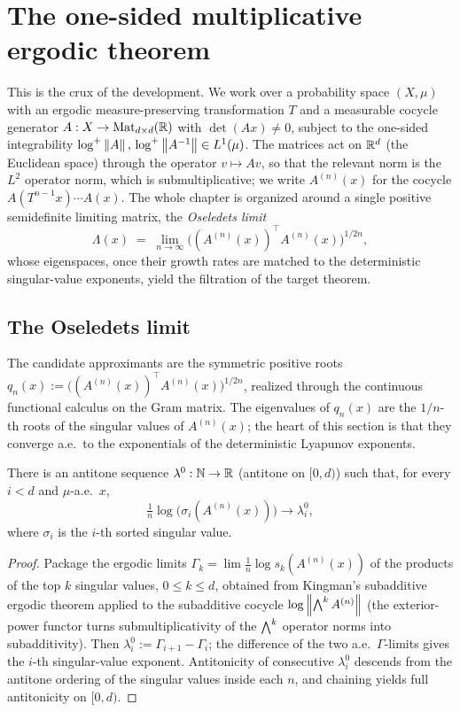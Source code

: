 \chapter{The one-sided multiplicative ergodic theorem}
\label{chap:met}

This is the crux of the development. We work over a probability space \((X,\mu)\) with an
ergodic measure-preserving transformation \(T\) and a measurable cocycle generator
\(A : X \to \mathrm{Mat}_{d\times d}(\mathbb{R})\) with \(\det(A x)\neq 0\), subject to the one-sided
integrability \(\log^{+}\left\lVert A \right\rVert,\,\log^{+}\left\lVert A^{-1} \right\rVert\in L^1(\mu)\). The matrices act on
\(\mathbb{R}^d\) (the Euclidean space) through the operator \(v\mapsto A v\), so that the relevant norm
is the \(L^2\) operator norm, which is submultiplicative; we write \(A^{(n)}(x)\) for the cocycle
\(A(T^{n-1}x)\cdots A(x)\). The whole chapter is organized around a single positive semidefinite
limiting matrix, the \emph{Oseledets limit}
\[
  \Lambda(x) \;=\; \lim_{n\to\infty} \bigl((A^{(n)}(x))^{\top} A^{(n)}(x)\bigr)^{1/2n},
\]
whose eigenspaces, once their growth rates are matched to the deterministic singular-value
exponents, yield the filtration of the target theorem.

\section{The Oseledets limit}

The candidate approximants are the symmetric positive roots
\(q_n(x) := \bigl((A^{(n)}(x))^{\top} A^{(n)}(x)\bigr)^{1/2n}\), realized through the continuous
functional calculus on the Gram matrix. The eigenvalues of \(q_n(x)\) are the \(1/n\)-th roots of
the singular values of \(A^{(n)}(x)\); the heart of this section is that they converge a.e.\ to
the exponentials of the deterministic Lyapunov exponents.

\begin{theorem}\label{exists_lam_tendsto_singularValue}
  \leanok
  There is an antitone sequence \(\lambda^0 : \mathbb{N}\to\mathbb{R}\) (antitone on \([0,d)\)) such that, for
  every \(i<d\) and \(\mu\)-a.e.\ \(x\),
  \[
    \tfrac1n \log\bigl(\sigma_i(A^{(n)}(x))\bigr) \longrightarrow \lambda^0_i,
  \]
  where \(\sigma_i\) is the \(i\)-th sorted singular value.
\end{theorem}
\begin{proof}\leanok
  Package the ergodic limits \(\Gamma_k = \lim \tfrac1n \log s_k(A^{(n)}(x))\) of the products of
  the top \(k\) singular values, \(0\le k\le d\), obtained from Kingman's subadditive ergodic
  theorem applied to the subadditive cocycle \(\log\left\lVert \textstyle\bigwedge^{k}A^{(n)} \right\rVert\) (the exterior-power
  functor turns submultiplicativity of the \(\textstyle\bigwedge^{k}\) operator norms into subadditivity). Then
  \(\lambda^0_i := \Gamma_{i+1}-\Gamma_i\); the difference of the two a.e.\ \(\Gamma\)-limits gives
  the \(i\)-th singular-value exponent. Antitonicity of consecutive \(\lambda^0_i\) descends from
  the antitone ordering of the singular values inside each \(n\), and chaining yields full
  antitonicity on \([0,d)\).
\end{proof}

